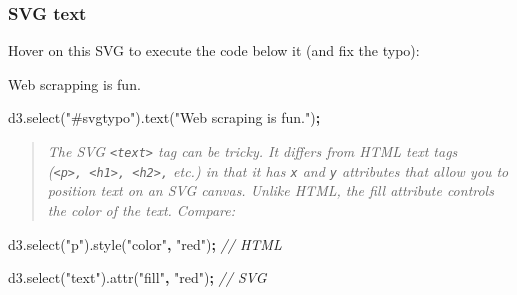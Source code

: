 \documentclass[openany]{book}
\newenvironment{Shaded}{\begin{snugshade}}{\end{snugshade}}
\newcommand{\AttributeTok}[1]{\textcolor[rgb]{0.77,0.63,0.00}{#1}}
\newcommand{\CommentTok}[1]{\textcolor[rgb]{0.56,0.35,0.01}{\textit{#1}}}
\newcommand{\KeywordTok}[1]{\textcolor[rgb]{0.13,0.29,0.53}{\textbf{#1}}}
\newcommand{\NormalTok}[1]{#1}
\newcommand{\OperatorTok}[1]{\textcolor[rgb]{0.81,0.36,0.00}{\textbf{#1}}}
\newcommand{\OtherTok}[1]{\textcolor[rgb]{0.56,0.35,0.01}{#1}}
\newcommand{\StringTok}[1]{\textcolor[rgb]{0.31,0.60,0.02}{#1}}
\newcommand{\VariableTok}[1]{\textcolor[rgb]{0.00,0.00,0.00}{#1}}
\begin{document}
\hypertarget{svg-text}{%
\subsubsection*{SVG text}\label{svg-text}}

\begin{Shaded}
\end{Shaded}

Hover on this SVG to execute the code below it (and fix the typo):

Web scrapping is fun.

\hypertarget{fixsvgtypo}{}
\begin{Shaded}
\begin{Highlighting}[]
\VariableTok{d3}\NormalTok{.}\AttributeTok{select}\NormalTok{(}\StringTok{"#svgtypo"}\NormalTok{).}\AttributeTok{text}\NormalTok{(}\StringTok{"Web scraping is fun."}\NormalTok{)}\OperatorTok{;}
\end{Highlighting}
\end{Shaded}

\begin{quote}
 \emph{The SVG \texttt{\textless{}text\textgreater{}} tag can be tricky. It differs from HTML text tags (\texttt{\textless{}p\textgreater{},\ \textless{}h1\textgreater{},\ \textless{}h2\textgreater{},} etc.) in that it has \texttt{x} and \texttt{y} attributes that allow you to position text on an SVG canvas. Unlike HTML, the fill attribute controls the color of the text. Compare:}
\end{quote}

\begin{Shaded}
\begin{Highlighting}[]
\VariableTok{d3}\NormalTok{.}\AttributeTok{select}\NormalTok{(}\StringTok{"p"}\NormalTok{).}\AttributeTok{style}\NormalTok{(}\StringTok{"color"}\OperatorTok{,} \StringTok{"red"}\NormalTok{)}\OperatorTok{;}   \CommentTok{// HTML}

\VariableTok{d3}\NormalTok{.}\AttributeTok{select}\NormalTok{(}\StringTok{"text"}\NormalTok{).}\AttributeTok{attr}\NormalTok{(}\StringTok{"fill"}\OperatorTok{,} \StringTok{"red"}\NormalTok{)}\OperatorTok{;}  \CommentTok{// SVG}
\end{Highlighting}
\end{Shaded}
\end{document}

